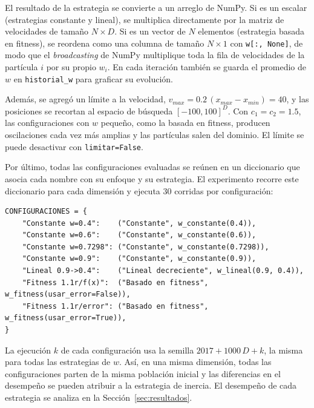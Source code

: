 El resultado de la estrategia se convierte a un arreglo de NumPy. Si es un escalar (estrategias constante y lineal), se multiplica directamente por la matriz de velocidades de tamaño $N \times D$. Si es un vector de $N$ elementos (estrategia basada en fitness), se reordena como una columna de tamaño $N \times 1$ con \texttt{w[:, None]}, de modo que el \emph{broadcasting} de NumPy multiplique toda la fila de velocidades de la partícula $i$ por su propio $w_i$. En cada iteración también se guarda el promedio de $w$ en \texttt{historial\_w} para graficar su evolución.

Además, se agregó un límite a la velocidad, $v_{max} = 0.2\,(x_{max} - x_{min}) = 40$, y las posiciones se recortan al espacio de búsqueda $[-100, 100]^D$. Con $c_1 = c_2 = 1.5$, las configuraciones con $w$ pequeño, como la basada en fitness, producen oscilaciones cada vez más amplias y las partículas salen del dominio. El límite se puede desactivar con \texttt{limitar=False}.

Por último, todas las configuraciones evaluadas se reúnen en un diccionario que asocia cada nombre con su enfoque y su estrategia. El experimento recorre este diccionario para cada dimensión y ejecuta 30 corridas por configuración:

\begin{lstlisting}[emph={w_constante, w_lineal, w_fitness}, caption={Configuraciones de $w$ evaluadas}]
CONFIGURACIONES = {
    "Constante w=0.4":    ("Constante", w_constante(0.4)),
    "Constante w=0.6":    ("Constante", w_constante(0.6)),
    "Constante w=0.7298": ("Constante", w_constante(0.7298)),
    "Constante w=0.9":    ("Constante", w_constante(0.9)),
    "Lineal 0.9->0.4":    ("Lineal decreciente", w_lineal(0.9, 0.4)),
    "Fitness 1.1r/f(x)":  ("Basado en fitness", w_fitness(usar_error=False)),
    "Fitness 1.1r/error": ("Basado en fitness", w_fitness(usar_error=True)),
}
\end{lstlisting}

La ejecución $k$ de cada configuración usa la semilla $2017 + 1000\,D + k$, la misma para todas las estrategias de $w$. Así, en una misma dimensión, todas las configuraciones parten de la misma población inicial y las diferencias en el desempeño se pueden atribuir a la estrategia de inercia. El desempeño de cada estrategia se analiza en la Sección~\ref{sec:resultados}.
